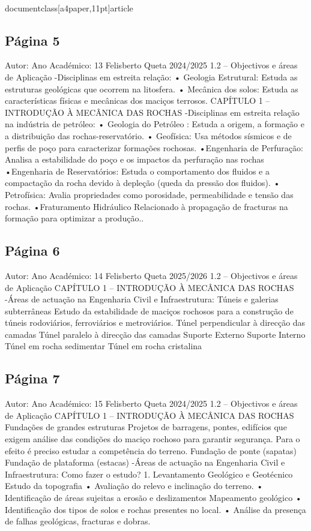 \\documentclass[a4paper,11pt]{article}
\begin{document}
\subsection*{Página 5}
Autor:
Ano Académico:
13
Felisberto Queta
2024/2025
1.2 – Objectivos e áreas de Aplicação
-Disciplinas em estreita relação:
• Geologia Estrutural:
Estuda as estruturas geológicas que ocorrem na litosfera.
• Mecânica dos solos:
Estuda as características físicas e mecânicas dos maciços terrosos.
CAPÍTULO 1 – INTRODUÇÃO À MECÂNICA DAS ROCHAS
-Disciplinas em estreita relação na indústria de petróleo:
• Geologia do Petróleo :
Estuda a origem, a formação e a distribuição das rochas-reservatório.
• Geofísica:
Usa métodos sísmicos e de perfis de poço para caracterizar formações rochosas.
•Engenharia
de
Perfuração:
Analisa a estabilidade do poço e os impactos da perfuração nas rochas
•Engenharia
de
Reservatórios:
Estuda o comportamento dos fluidos e a compactação da rocha devido à depleção (queda
da pressão dos fluidos).
• Petrofísica:
Avalia propriedades como porosidade, permeabilidade e tensão das rochas.
•Fraturamento Hidráulico
Relacionado à propagação de fracturas na formação para optimizar a produção..



\subsection*{Página 6}
Autor:
Ano Académico:
14
Felisberto Queta
2025/2026
1.2 – Objectivos e áreas de Aplicação
CAPÍTULO 1 – INTRODUÇÃO À MECÂNICA DAS ROCHAS
-Áreas de actuação na Engenharia Civil e 
Infraestrutura:
Túneis
e
galerias
subterrâneas
Estudo da estabilidade de maciços rochosos para a construção de túneis rodoviários,
ferroviários e metroviários.
Túnel perpendicular à direcção das 
camadas
Túnel paralelo à direcção das 
camadas
Suporte Externo
Suporte Interno
Túnel em rocha 
sedimentar
Túnel em rocha 
cristalina



\subsection*{Página 7}
Autor:
Ano Académico:
15
Felisberto Queta
2024/2025
1.2 – Objectivos e áreas de Aplicação
CAPÍTULO 1 – INTRODUÇÃO À MECÂNICA DAS ROCHAS
Fundações de grandes estruturas
Projetos de barragens, pontes, edifícios que exigem análise
das condições do maciço rochoso para garantir segurança.
Para o efeito é preciso estudar a competência do terreno.
Fundação de ponte (sapatas)
Fundação de plataforma (estacas)
-Áreas de actuação na Engenharia Civil e 
Infraestrutura:
Como fazer o estudo?
1. Levantamento Geológico e Geotécnico
Estudo da topografia
•
Avaliação do relevo e inclinação do terreno.
•
Identificação de áreas sujeitas a erosão e deslizamentos
Mapeamento geológico
•
Identificação dos tipos de solos e rochas presentes no local.
•
Análise da presença de falhas geológicas, fracturas e 
dobras.
\end{document}
